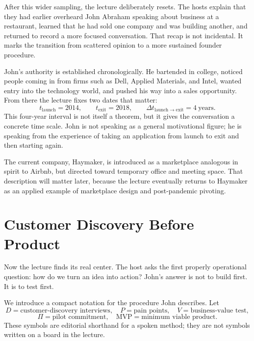 After this wider sampling, the lecture deliberately resets. The hosts explain that they had earlier overheard John Abraham speaking about business at a restaurant, learned that he had sold one company and was building another, and returned to record a more focused conversation. That recap is not incidental. It marks the transition from scattered opinion to a more sustained founder procedure.

John's authority is established chronologically. He bartended in college, noticed people coming in from firms such as Dell, Applied Materials, and Intel, wanted entry into the technology world, and pushed his way into a sales opportunity. From there the lecture fixes two dates that matter:
\begin{equation}
t_{\mathrm{launch}} = 2014,\qquad t_{\mathrm{exit}} = 2018,\qquad \Delta t_{\mathrm{launch\to exit}} = 4\ \text{years}.
\end{equation}
This four-year interval is not itself a theorem, but it gives the conversation a concrete time scale. John is not speaking as a general motivational figure; he is speaking from the experience of taking an application from launch to exit and then starting again.

The current company, Haymaker, is introduced as a marketplace analogous in spirit to Airbnb, but directed toward temporary office and meeting space. That description will matter later, because the lecture eventually returns to Haymaker as an applied example of marketplace design and post-pandemic pivoting.

\section{Customer Discovery Before Product}

Now the lecture finds its real center. The host asks the first properly operational question: how do we turn an idea into action? John's answer is not to build first. It is to test first.

\begin{definition}
We introduce a compact notation for the procedure John describes. Let
\[
D = \text{customer-discovery interviews},\quad
P = \text{pain points},\quad
V = \text{business-value test},
\]
\[
\Pi = \text{pilot commitment},\quad
\mathrm{MVP} = \text{minimum viable product}.
\]
These symbols are editorial shorthand for a spoken method; they are not symbols written on a board in the lecture.
\end{definition}


